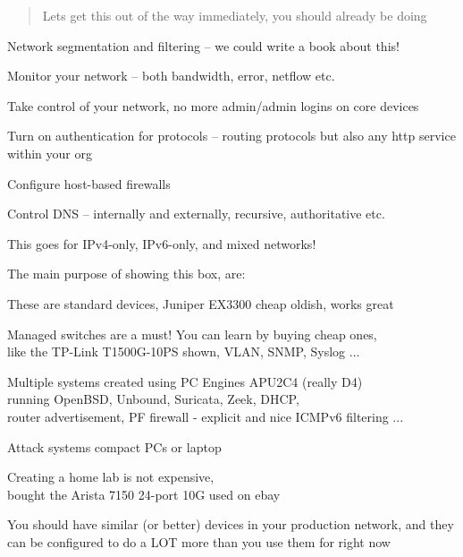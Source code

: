 \documentclass[Screen16to9,17pt]{foils}
\begin{document}


\begin{quote}
Lets get this out of the way immediately, you should already be doing
\end{quote}

\begin{list2}
\item Network segmentation and filtering -- we could write a book about this! {\myalert}
\item Monitor your network -- both bandwidth, error, netflow etc. {\myalert}
\item Take control of your network, no more admin/admin logins on core devices {\myalert}
\item Turn on authentication for protocols -- routing protocols but also any http service within your org {\myalert}
\item Configure host-based firewalls {\myalert}
\item Control DNS -- internally and externally, recursive, authoritative etc. {\myalert}
\end{list2}

\centerline{This goes for IPv4-only, IPv6-only, and mixed networks!}



The main purpose of showing this box, are:
\begin{list2}
\item These are standard devices, Juniper EX3300 cheap oldish, works great
\item Managed switches are a must! You can learn by buying cheap ones,\\
like the TP-Link T1500G-10PS  shown, VLAN, SNMP, Syslog ...
\item Multiple systems created using PC Engines APU2C4 (really D4)\\
running OpenBSD, Unbound, Suricata, Zeek, DHCP, \\
router advertisement, PF firewall - explicit and nice ICMPv6 filtering ...
\item Attack systems compact PCs or laptop
\item Creating a home lab is not expensive, \\
bought the Arista 7150 24-port 10G used on ebay
\end{list2}

You should have similar (or better) devices in your production network, and they can be
configured to do a LOT more than you use them for right now
\end{document}
